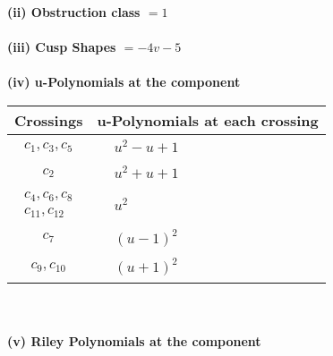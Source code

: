 \documentclass[1p]{elsarticle_modified}
\theoremstyle{definition}
\begin{document}
\flushleft \textbf{(ii) Obstruction class $= 1$}\\~\\
\flushleft \textbf{(iii) Cusp Shapes $= -4 v-5$}\\~\\
\newpage\renewcommand{\arraystretch}{1}
\flushleft \textbf{(iv) u-Polynomials at the component}\newline \\
\begin{tabular}{m{50pt}|m{274pt}}
Crossings & \hspace{64pt}u-Polynomials at each crossing \\
\hline $$\begin{aligned}c_{1},c_{3},c_{5}\end{aligned}$$&$\begin{aligned}
&u^2- u+1
\end{aligned}$\\
\hline $$\begin{aligned}c_{2}\end{aligned}$$&$\begin{aligned}
&u^2+u+1
\end{aligned}$\\
\hline $$\begin{aligned}c_{4},c_{6},c_{8}\\c_{11},c_{12}\end{aligned}$$&$\begin{aligned}
&u^2
\end{aligned}$\\
\hline $$\begin{aligned}c_{7}\end{aligned}$$&$\begin{aligned}
&(u-1)^2
\end{aligned}$\\
\hline $$\begin{aligned}c_{9},c_{10}\end{aligned}$$&$\begin{aligned}
&(u+1)^2
\end{aligned}$\\
\hline
\end{tabular}\\~\\
\newpage\renewcommand{\arraystretch}{1}
\flushleft \textbf{(v) Riley Polynomials at the component}\newline \\
\end{document}
